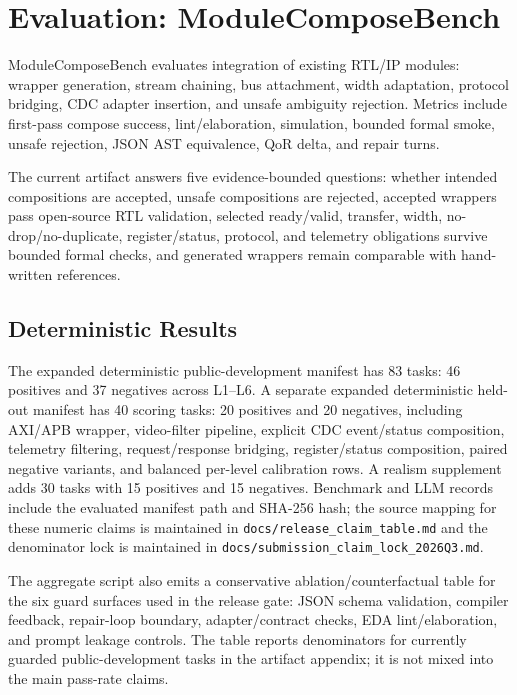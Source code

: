 \section{Evaluation: ModuleComposeBench}

ModuleComposeBench evaluates integration of existing RTL/IP modules: wrapper generation, stream chaining, bus attachment, width adaptation, protocol bridging, CDC adapter insertion, and unsafe ambiguity rejection. Metrics include first-pass compose success, lint/elaboration, simulation, bounded formal smoke, unsafe rejection, JSON AST equivalence, QoR delta, and repair turns.

The current artifact answers five evidence-bounded questions: whether intended compositions are accepted, unsafe compositions are rejected, accepted wrappers pass open-source RTL validation, selected ready/valid, transfer, width, no-drop/no-duplicate, register/status, protocol, and telemetry obligations survive bounded formal checks, and generated wrappers remain comparable with hand-written references.

\subsection{Deterministic Results}

The expanded deterministic public-development manifest has 83 tasks: 46 positives and 37 negatives across L1--L6. A separate expanded deterministic held-out manifest has 40 scoring tasks: 20 positives and 20 negatives, including AXI/APB wrapper, video-filter pipeline, explicit CDC event/status composition, telemetry filtering, request/response bridging, register/status composition, paired negative variants, and balanced per-level calibration rows. A realism supplement adds 30 tasks with 15 positives and 15 negatives. Benchmark and LLM records include the evaluated manifest path and SHA-256 hash; the source mapping for these numeric claims is maintained in \texttt{docs/release\_claim\_table.md} and the denominator lock is maintained in \texttt{docs/submission\_claim\_lock\_2026Q3.md}.

\begin{table}[t]
  \centering
  \caption{Benchmark split summary generated from manifest and result JSON}
  \label{tab:benchmark-splits}
  \resizebox{\textwidth}{!}{}
\end{table}

The aggregate script also emits a conservative ablation/counterfactual table
for the six guard surfaces used in the release gate: JSON schema validation,
compiler feedback, repair-loop boundary, adapter/contract checks, EDA
lint/elaboration, and prompt leakage controls. The table reports denominators
for currently guarded public-development tasks in the artifact appendix; it is
not mixed into the main pass-rate claims.

